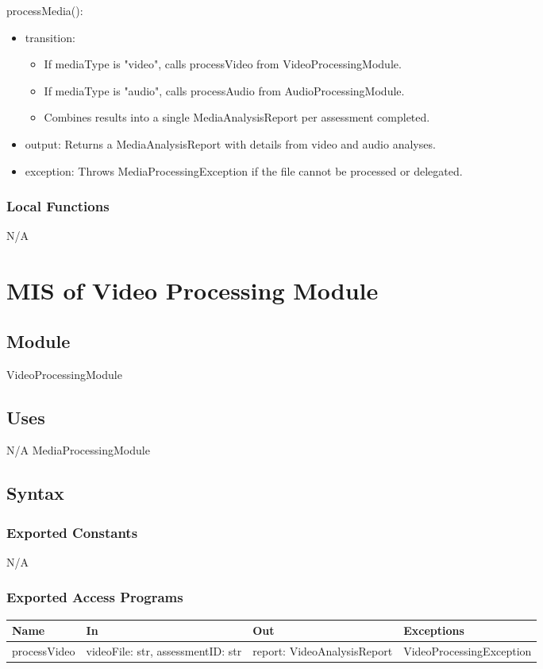 \documentclass[12pt, titlepage]{article}
\begin{document}
\noindent processMedia():
\begin{itemize}
\item transition:
\begin{itemize}
\item If mediaType is "video", calls processVideo from VideoProcessingModule.
\item If mediaType is "audio", calls processAudio from AudioProcessingModule.
\item Combines results into a single MediaAnalysisReport per assessment completed.
\end{itemize}
\item output: Returns a MediaAnalysisReport with details from video and audio analyses.
\item exception: Throws MediaProcessingException if the file cannot be processed or delegated.
\end{itemize}

\subsubsection{Local Functions}
N/A

\newpage

\section{MIS of Video Processing Module} \label{VideoProcessingModule}

\subsection{Module}
VideoProcessingModule

\subsection{Uses}
N/A
MediaProcessingModule

\subsection{Syntax}

\subsubsection{Exported Constants}
N/A

\subsubsection{Exported Access Programs}
\begin{center}
  \begin{tabular}{p{3cm} p{4cm} p{4cm} p{5cm}}
  \hline
  \textbf{Name} & \textbf{In} & \textbf{Out} & \textbf{Exceptions} \\
  \hline
  processVideo & \raggedright\arraybackslash videoFile: str, assessmentID: str & \raggedright\arraybackslash report: VideoAnalysisReport & \raggedright\arraybackslash VideoProcessingException \\
  \end{tabular}
\end{center}
\end{document}
